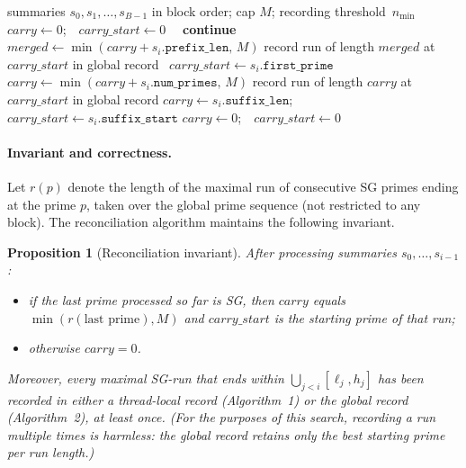 \documentclass[11pt,a4paper]{article}
\newtheorem{proposition}[theorem]{Proposition}
\theoremstyle{definition}
\begin{document}
\begin{algorithm}[ht]
\caption{Boundary reconciliation (executed serially after the parallel phase)}
\begin{algorithmic}[1]
\Require summaries $s_0, s_1, \ldots, s_{B-1}$ in block order; cap $M$;
recording threshold~$n_{\min}$
\State $\textit{carry} \gets 0$;\ \ $\textit{carry\_start} \gets 0$
  \ \ \textbf{continue}\EndIf
     \State $\textit{merged} \gets \min(\textit{carry} + s_i.\texttt{prefix\_len},\,M)$
       \State record run of length $\textit{merged}$ at $\textit{carry\_start}$ in global record
     \EndIf
  \EndIf
     \ $\textit{carry\_start} \gets s_i.\texttt{first\_prime}$\EndIf
     \State $\textit{carry} \gets \min(\textit{carry} + s_i.\texttt{num\_primes},\,M)$
       \State record run of length $\textit{carry}$ at $\textit{carry\_start}$ in global record 
     \EndIf
     \State $\textit{carry} \gets s_i.\texttt{suffix\_len}$;\ \ $\textit{carry\_start} \gets s_i.\texttt{suffix\_start}$
  \Else
     \State $\textit{carry} \gets 0$;\ \ $\textit{carry\_start} \gets 0$
  \EndIf
\EndFor
\end{algorithmic}
\end{algorithm}

\paragraph{Invariant and correctness.}
Let $r(p)$ denote the length of the maximal run of consecutive SG primes
ending at the prime $p$, taken over the global prime sequence (not
restricted to any block). The reconciliation algorithm maintains the
following invariant.

\begin{proposition}[Reconciliation invariant]
\label{prop:invariant}
After processing summaries $s_0, \ldots, s_{i-1}$:
\begin{itemize}
\item if the last prime processed so far is SG, then $\textit{carry}$
equals $\min(r(\text{last prime}), M)$ and
$\textit{carry\_start}$ is the starting prime of that run;
\item otherwise $\textit{carry} = 0$.
\end{itemize}
Moreover, every maximal SG-run that ends within $\bigcup_{j<i} [\ell_j, h_j]$
has been recorded in either a thread-local record (Algorithm~1) or the
global record (Algorithm~2), at least once.
(For the purposes of this search, recording a run multiple times is
harmless: the global record retains only the best starting prime per
run length.)
\end{proposition}
\end{document}
